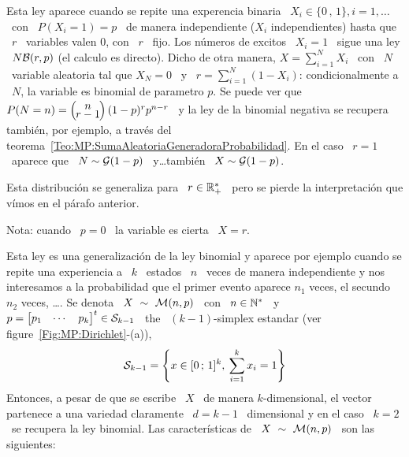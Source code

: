 Esta ley aparece cuando se repite una experencia binaria \ $X_i \in \{ 0 \, , \,
1 \},  i = 1, \ldots$  \ con \ $P(X_i=1)  = p$ \ de  manera independiente ($X_i$
independientes) hasta  que \  $r$ \  variables valen 0,  con \  $r$ \  fijo. Los
n\'umeros de  excitos \ $X_i =  1$ \ sigue una  ley \ $N\mathcal{B}(r,p)$  (el calculo es
directo).  Dicho de otra  manera, $X = \sum_{i=1}^N X_i$ \ con  \ $N$ \ variable
aleatoria tal que $X_N = 0$ \ y \ $r = \sum_{i=1}^N (1-X_i)$: condicionalmente a
\ $N$, la variable es binomial de parametro $p$.  Se puede ver que \ $P(N = n) =
\bino{n}{r-1} (1-p)^r  p^{n-r}$ \ y la  ley de la binomial  negativa se recupera
tambi\'en,          por         ejemplo,         a          trav\'es         del
teorema~\ref{Teo:MP:SumaAleatoriaGeneradoraProbabilidad}. En el caso \ $r = 1$ \
aparece que \ $N \sim \mathcal{G}(1-p)$ \ y\ldots tambi\'en \ $X \sim \mathcal{G}(1-p)$.
%

Esta distribuci\'on se  generaliza para \ $r \in \mathbb{R}_+^*$ \  pero se pierde la
interpretaci\'on que v\'imos en el p\'arafo anterior.

Nota: cuando \ $p = 0$ \ la variable es cierta \ $X = r$.



\label{Sssec:MP:Multinomial}

Esta ley es una generalizaci\'on de la ley binomial y aparece por ejemplo cuando
se  repite  una  experiencia  a  \  $k$  \ estados  \  $n$  \  veces  de  manera
independiente y nos  interesamos a la probabilidad que  el primer evento aparece
$n_1$ veces, el secundo $n_2$ veces, \ldots.  Se denota \ $X \ \sim \ \M(n,p)$ \
con  \  $n   \in  \mathbb{N}^*$  \  y   \  $p  =  \begin{bmatrix}  p_1   &  \cdots  &
  p_k  \end{bmatrix}^t \in \mathcal{S}_{k-1}$  \ the  \ $(k-1)$-simplex  estandar (ver
figure~\ref{Fig:MP:Dirichlet}-(a)),
%
\[
\mathcal{S}_{k-1} = \left\{ x \in [ 0 \, ; \, 1 ]^k,  \: \sum_{i=1}^k x_i = 1 \right\}
\]
%
Entonces, a pesar de que se escribe \ $X$ \ de manera $k$-dimensional, el vector
partenece a una variedad claramente \ $d =  k-1$ \ dimensional y en el caso \ $k
= 2$  \ se recupera  la ley binomial.   Las caracter\'isticas de  \ $X \  \sim \
\mathcal{M}(n,p)$ \ son las siguientes:

